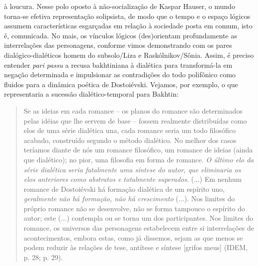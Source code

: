 à loucura. Nesse polo oposto à não-socialização de Kaspar Hauser, o
mundo torna-se efetiva representação solipsista, de modo que o tempo e o
espaço lógicos assumem características esgarçadas em relação à sociedade
posta em comum, isto é, comunicada. No mais, os vínculos lógicos
(des)orientam profundamente as interrelações das personagens, conforme
vimos demonstrando com os pares dialógico-dialéticos homem do
subsolo/Liza e Raskólnikov/Sônia. Assim, é preciso entender \emph{pari
passu} a recusa bakhtiniana à dialética para transformá-la em negação
determinada e impulsionar as contradições do todo polifônico como
fluidos para a dinâmica poética de Dostoiévski. Vejamos, por exemplo, o
que representaria a sucessão dialético-temporal para Bakhtin:

\begin{quote}
Se as ideias em cada romance -- os planos do romance são determinados
pelas idéias que lhe servem de base -- fossem realmente distribuídas
como elos de uma série dialética una, cada romance seria um todo
filosófico acabado, construído segundo o método dialético. No melhor dos
casos teríamos diante de nós um romance filosófico, um romance de ideias
(ainda que dialético); no pior, uma filosofia em forma de romance.
\emph{O último elo da série dialética seria fatalmente uma síntese do
autor, que eliminaria os elos anteriores como abstratos e totalmente
superados}. (...) Em nenhum romance de Dostoiévski há formação dialética
de um espírito uno, \emph{geralmente não há formação, não há
crescimento} (...). Nos limites do próprio romance não se desenvolve,
não se forma tampouco o espírito do autor; este (...) contempla ou se
torna um dos participantes. Nos limites do romance, os universos das
personagens estabelecem entre si interrelações de acontecimentos, embora
estas, como já dissemos, sejam as que menos se podem reduzir às relações
de tese, antítese e síntese {[}grifos meus{]} (IDEM, p. 28; p. 29).
\end{quote}

